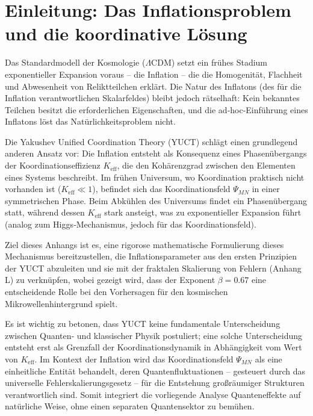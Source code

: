 \documentclass[12pt]{article}
\theoremstyle{remark}
\newcommand{\Keff}{K_{\mathrm{eff}}}
\begin{document}
	\tableofcontents
	\newpage
	
	\section{Einleitung: Das Inflationsproblem und die koordinative Lösung}
	\label{sec:intro}
	
	Das Standardmodell der Kosmologie ($\Lambda$CDM) setzt ein frühes Stadium exponentieller Expansion voraus – die Inflation – die die Homogenität, Flachheit und Abwesenheit von Reliktteilchen erklärt. Die Natur des Inflatons (des für die Inflation verantwortlichen Skalarfeldes) bleibt jedoch rätselhaft: Kein bekanntes Teilchen besitzt die erforderlichen Eigenschaften, und die ad‑hoc‑Einführung eines Inflatons löst das Natürlichkeitsproblem nicht.
	
	Die Yakushev Unified Coordination Theory (YUCT) schlägt einen grundlegend anderen Ansatz vor: Die Inflation entsteht als Konsequenz eines Phasenübergangs der Koordinationseffizienz $\Keff$, die den Kohärenzgrad zwischen den Elementen eines Systems beschreibt. Im frühen Universum, wo Koordination praktisch nicht vorhanden ist ($\Keff \ll 1$), befindet sich das Koordinationsfeld $\Psi_{MN}$ in einer symmetrischen Phase. Beim Abkühlen des Universums findet ein Phasenübergang statt, während dessen $\Keff$ stark ansteigt, was zu exponentieller Expansion führt (analog zum Higgs‑Mechanismus, jedoch für das Koordinationsfeld).
	
	Ziel dieses Anhangs ist es, eine rigorose mathematische Formulierung dieses Mechanismus bereitzustellen, die Inflationsparameter aus den ersten Prinzipien der YUCT abzuleiten und sie mit der fraktalen Skalierung von Fehlern (Anhang L) zu verknüpfen, wobei gezeigt wird, dass der Exponent $\beta = 0.67$ eine entscheidende Rolle bei den Vorhersagen für den kosmischen Mikrowellenhintergrund spielt.
	
	Es ist wichtig zu betonen, dass YUCT keine fundamentale Unterscheidung zwischen Quanten‑ und klassischer Physik postuliert; eine solche Unterscheidung entsteht erst als Grenzfall der Koordinationsdynamik in Abhängigkeit vom Wert von $K_{\mathrm{eff}}$. Im Kontext der Inflation wird das Koordinationsfeld $\Psi_{MN}$ als eine einheitliche Entität behandelt, deren Quantenfluktuationen – gesteuert durch das universelle Fehlerskalierungsgesetz – für die Entstehung großräumiger Strukturen verantwortlich sind. Somit integriert die vorliegende Analyse Quanteneffekte auf natürliche Weise, ohne einen separaten Quantensektor zu bemühen.
	
\end{document}
